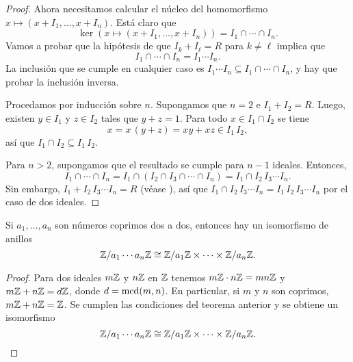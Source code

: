 \begin{nameless}
\begin{proof}
   Ahora necesitamos calcular el núcleo del homomorfismo
   $x \mapsto (x+I_1,\ldots,x+I_n)$. Está claro que
   $$\ker (x \mapsto (x+I_1,\ldots,x+I_n)) = I_1 \cap \cdots \cap I_n.$$
   Vamos a probar que la hipótesis de que $I_k + I_\ell = R$ para $k \ne \ell$
   implica que
   $$I_1 \cap \cdots \cap I_n = I_1\cdots I_n.$$
   La inclusión que se cumple en cualquier caso es
   $I_1\cdots I_n \subseteq I_1\cap\cdots\cap I_n$, y hay que probar
   la inclusión inversa.

   Procedamos por inducción sobre $n$. Supongamos que $n = 2$ e
   $I_1 + I_2 = R$. Luego, existen $y \in I_1$ y $z \in I_2$ tales que
   $y + z = 1$. Para todo $x \in I_1 \cap I_2$ se tiene
   $$x = x\,(y+z) = xy + xz \in I_1\,I_2,$$
   así que $I_1\cap I_2 \subseteq I_1\,I_2$.

   Para $n > 2$, supongamos que el resultado se cumple para $n-1$
   ideales. Entonces,
   \[ I_1 \cap \cdots \cap I_n = I_1 \cap (I_2\cap I_3\cap \cdots\cap I_n) =
      I_1 \cap I_2\,I_3\cdots I_n. \]
   Sin embargo, $I_1 + I_2\,I_3\cdots I_n = R$ (véase
   ), así que
   $I_1 \cap I_2\,I_3\cdots I_n = I_1\,I_2\,I_3\cdots I_n$ por el caso de dos
   ideales.
 \end{proof}
\end{nameless}

\begin{corolario}
  Si $a_1, \ldots, a_n$ son números coprimos dos a dos, entonces hay
  un isomorfismo de anillos
  $$\mathbb{Z}/a_1\cdots a_n\mathbb{Z} \cong \mathbb{Z}/a_1\mathbb{Z} \times \cdots \times \mathbb{Z}/a_n\mathbb{Z}.$$

  \begin{proof}
    Para dos ideales $m\mathbb{Z}$ y $n\mathbb{Z}$ en $\mathbb{Z}$ tenemos $m\mathbb{Z}\cdot n\mathbb{Z} = mn\mathbb{Z}$
    y $m\mathbb{Z} + n\mathbb{Z} = d\mathbb{Z}$, donde $d = \operatorname{mcd} (m,n)$. En particular, si $m$ y $n$
    son coprimos, $m\mathbb{Z} + n\mathbb{Z} = \mathbb{Z}$. Se cumplen las condiciones del teorema
    anterior y se obtiene un isomorfismo
    \[ \mathbb{Z}/a_1\cdots a_n\mathbb{Z} \cong
       \mathbb{Z}/a_1\mathbb{Z} \times \cdots \times \mathbb{Z}/a_n\mathbb{Z}. \qedhere \]
  \end{proof}
\end{corolario}

